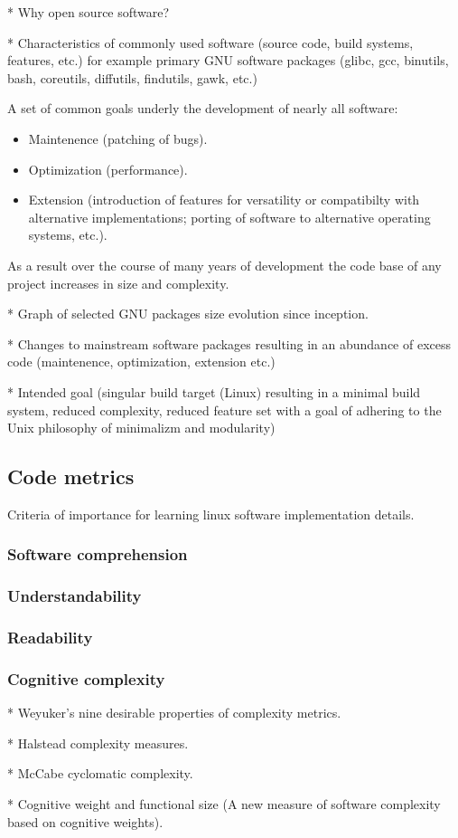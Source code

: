 * Why open source software?

* Characteristics of commonly used software (source code, build systems, features, etc.) for example primary GNU software packages (glibc, gcc, binutils, bash, coreutils, diffutils, findutils, gawk, etc.)

A set of common goals underly the development of nearly all software:

\begin{itemize}
    \item Maintenence (patching of bugs).
    \item Optimization (performance).
    \item Extension (introduction of features for versatility or compatibilty with alternative implementations; porting of software to alternative operating systems, etc.).
\end{itemize}

As a result over the course of many years of development the code base of any project increases in size and complexity.

* Graph of selected GNU packages size evolution since inception.

* Changes to mainstream software packages resulting in an abundance of excess code (maintenence, optimization, extension etc.)

* Intended goal (singular build target (Linux) resulting in a minimal build system, reduced complexity, reduced feature set with a goal of adhering to the Unix philosophy of minimalizm and modularity)


\subsection{Code metrics}

Criteria of importance for learning linux software implementation details.

\subsubsection{Software comprehension}

\subsubsection{Understandability}

\subsubsection{Readability}

\subsubsection{Cognitive complexity}

* Weyuker's nine desirable properties of complexity metrics.

* Halstead complexity measures.

* McCabe cyclomatic complexity.

* Cognitive weight and functional size (A new measure of software complexity based on cognitive weights).
